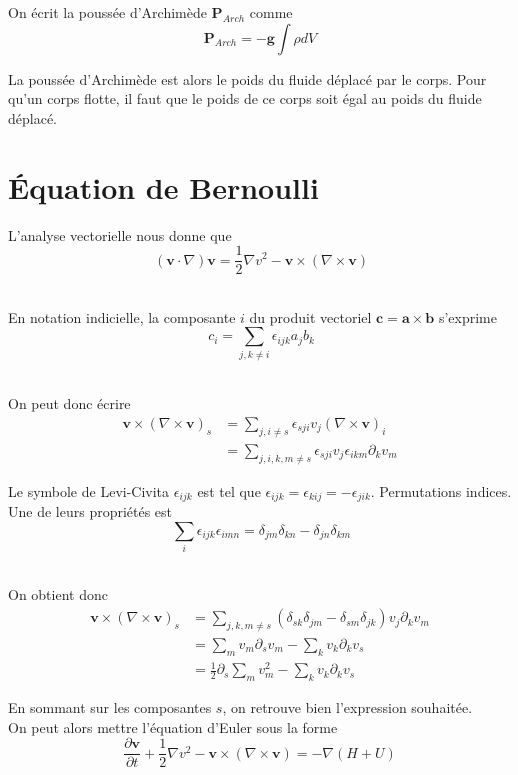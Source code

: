 \documentclass[10pt,a4paper]{book}
\begin{document}
On écrit la poussée d'Archimède $\mathbf{P}_{Arch}$ comme
\begin{equation}
\label{Arch}
\mathbf{P}_{Arch}=-\mathbf{g}\int \rho dV
\end{equation}

La poussée d'Archimède est alors le poids du fluide déplacé par le corps. Pour qu'un corps flotte, il faut que le poids de ce corps soit égal au poids du fluide déplacé.\\

\section{Équation de Bernoulli}
\label{Bernoulli}

L'analyse vectorielle nous donne que \[\ (\mathbf{v}\cdot\nabla)\mathbf{v} = \frac{1}{2}\nabla v^2-\mathbf{v}\times(\nabla \times \mathbf{v}) \]\

En notation indicielle, la composante $i$ du produit vectoriel $\mathbf{c}=\mathbf{a}\times \mathbf{b}$ s'exprime\[\ c_i=\sum_{j,k\ne i}\epsilon_{ijk}a_jb_k\]\

On peut donc écrire 
\begin{align*}
\mathbf{v}\times(\nabla \times \mathbf{v})_s &= \sum_{j,i\ne s} \epsilon_{sji}v_j(\nabla \times \mathbf{v})_i \\
& = \sum_{j,i,k,m\ne s} \epsilon_{sji}v_j\epsilon_{ikm}\partial_kv_m
\end{align*}

Le symbole de Levi-Civita $\epsilon_{ijk}$ est tel que $\epsilon_{ijk}=\epsilon_{kij}=-\epsilon_{jik}$. Permutations indices. Une de leurs propriétés est \[\ \sum_i \epsilon_{ijk}\epsilon_{imn}=\delta_{jm}\delta_{kn}-\delta_{jn}\delta_{km} \]\

On obtient donc 
\begin{align*}
\mathbf{v}\times(\nabla \times \mathbf{v})_s & = \sum_{j,k,m\ne s} (\delta_{sk}\delta_{jm}-\delta_{sm}\delta_{jk})v_j\partial_kv_m\\
&= \sum_m v_m\partial_s v_m - \sum_k v_k\partial_k v_s\\
&=\frac{1}{2}\partial_s\sum_m v_m^2-\sum_kv_k\partial_k v_s
\end{align*}

En sommant sur les composantes $s$, on retrouve bien l'expression souhaitée.\\

On peut alors mettre l'équation d'Euler sous la forme 
\begin{equation}
\frac{\partial \mathbf{v}}{\partial t}+\frac{1}{2}\nabla v^2-\mathbf{v}\times(\nabla \times \mathbf{v})=-\nabla (H+U)
\end{equation}
\end{document}
